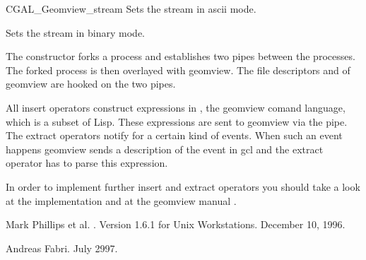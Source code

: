 \begin{ccClass}{CGAL_Geomview_stream}
{Sets the stream in ascii mode.}

{Sets the stream in binary mode.}



\begin{cprog}

\end{cprog} 

\ccImplementation

The constructor forks a process and establishes two pipes between the
processes. The forked process is then overlayed with geomview. The
file descriptors  and  of geomview are hooked
on the two pipes.

All insert operators construct expressions in , the geomview
comand language, which is a subset of {\sc Lisp}. These expressions
are sent to geomview via the pipe. The extract operators notify 
for a certain kind of events. When such an event happens geomview
sends a description of the event in gcl and the extract operator has
to parse this expression.

In order to implement further insert and extract operators you should
take a look at the implementation \cite{GV_Impl} and at the geomview
manual \cite{GVManual}.
\end{ccClass}

\begin{thebibliography}{10}

Mark Phillips et al.
.
\newblock Version 1.6.1 for Unix Workstations.
\newblock December 10, 1996.


Andreas Fabri.
\newblock July 2997.
\end{thebibliography}

